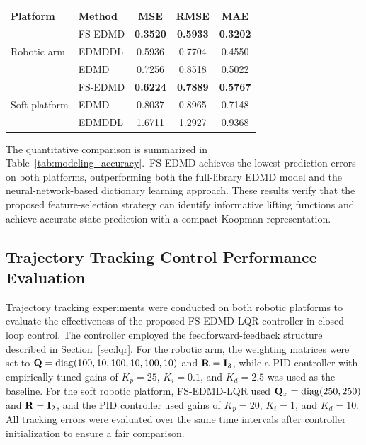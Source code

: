 \begin{tablehere}
\centering
\caption{State prediction accuracy comparison of different Koopman models.}
\label{tab:modeling_accuracy}
\small
\setlength{\tabcolsep}{3pt}
\begin{tabular}{llccc}
\toprule
Platform & Method & MSE & RMSE & MAE \\
\midrule
\multirow{3}{*}{Robotic arm}
    & FS-EDMD & \textbf{0.3520} & \textbf{0.5933} & \textbf{0.3202} \\
    & EDMDDL & 0.5936 & 0.7704 & 0.4550 \\
    & EDMD & 0.7256 & 0.8518 & 0.5022 \\
\midrule
\multirow{3}{*}{Soft platform}
    & FS-EDMD & \textbf{0.6224} & \textbf{0.7889} & \textbf{0.5767} \\
    & EDMD & 0.8037 & 0.8965 & 0.7148 \\
    & EDMDDL & 1.6711 & 1.2927 & 0.9368 \\
\bottomrule
\end{tabular}
\end{tablehere}

The quantitative comparison is summarized in Table~\ref{tab:modeling_accuracy}.\footnotemark\ FS-EDMD achieves the lowest prediction errors on both platforms, outperforming both the full-library EDMD model and the neural-network-based dictionary learning approach. These results verify that the proposed feature-selection strategy can identify informative lifting functions and achieve accurate state prediction with a compact Koopman representation.



\subsection{Trajectory Tracking Control Performance Evaluation}
\label{subsec:control_performance}

Trajectory tracking experiments were conducted on both robotic platforms to evaluate the effectiveness of the proposed FS-EDMD-LQR controller in closed-loop control. The controller employed the feedforward-feedback structure described in Section~\ref{sec:lqr}. For the robotic arm, the weighting matrices were set to $\mathbf{Q}=\mathrm{diag}(100,10,100,10,100,10)$ and $\mathbf{R}=\mathbf{I}_3$, while a PID controller with empirically tuned gains of $K_p=25$, $K_i=0.1$, and $K_d=2.5$ was used as the baseline. For the soft robotic platform, FS-EDMD-LQR used $\mathbf{Q}_x=\mathrm{diag}(250,250)$ and $\mathbf{R}=\mathbf{I}_2$, and the PID controller used gains of $K_p=20$, $K_i=1$, and $K_d=10$. All tracking errors were evaluated over the same time intervals after controller initialization to ensure a fair comparison.

